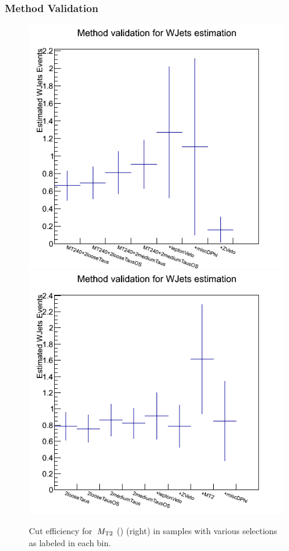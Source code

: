 \subsubsection{Method Validation}
\begin{figure}[htbp]
\centering
\includegraphics[angle=0,scale=0.35]{TauTauFigs/withMT2GT40.png}
\includegraphics[angle=0,scale=0.35]{TauTauFigs/WJetsEst_bin2_BJetVetoApplied.png} \\
\caption{Cut efficiency for $\,{M_{\rm T2}}$ (\SumMT) (right) 
in samples with various selections as labeled in each bin.}
\label{fig:justification}
\end{figure}
